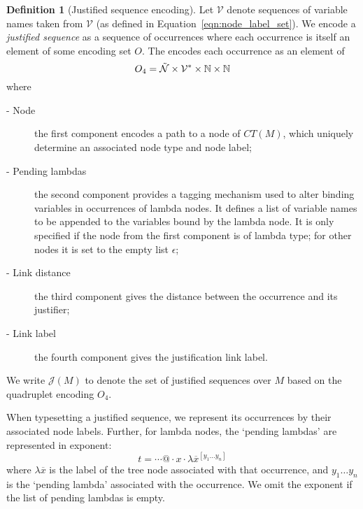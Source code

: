 \documentclass{article}
\theoremstyle{definition}
\newtheorem{definition}{Definition}[section]
\newcommand\Nodes{\mathcal{N}}%
\newcommand\ExtendedNodes{\tilde{\Nodes}}
\newcommand{\ctree}{CT} %
\def\justseqset{\mathcal{J}}
\begin{document}
\begin{definition}[Justified sequence encoding]
    Let $\mathcal{V}$ denote sequences of variable names taken from $\mathcal{V}$ (as defined in Equation~\ref{eqn:node_label_set}).
    We encode a \emph{justified sequence} as a sequence of occurrences where each occurrence is itself an element of some encoding set $O$.
    The  encodes each occurrence as an element of
$$O_4 =  \ExtendedNodes\times \mathcal{V}^* \times\nat\times\nat$$
where
\begin{description}
    \item [- Node] the first component encodes a path to a node of $\ctree(M)$, which uniquely determine an associated node type and node label;
    \item[- Pending lambdas] the second component provides a tagging mechanism used to alter binding variables in occurrences of lambda nodes. It defines a list of variable names to be appended to the  variables bound by the lambda node. It is only specified if the node from the first component is of lambda type; for other nodes it is set to the empty list $\epsilon$;
    \item[- Link distance] the third component gives the distance between the occurrence and its justifier;
    \item[- Link label] the fourth component gives the justification link label.
\end{description}
\end{definition}

We write $\justseqset(M)$ to denote the set of justified sequences over $M$ based on the quadruplet encoding $O_4$.

When typesetting a justified sequence, we represent its occurrences by their associated node labels. Further, for lambda nodes, the `pending lambdas' are represented in exponent:
$$t = \cdots @ \cdot x \cdot \lambda\overline{x}^{[y_1 \ldots y_n]}$$
where $\lambda\overline{x}$ is the label of the tree node associated with that occurrence, and $y_1 \ldots y_n$ is the `pending lambda' associated with the occurrence. We omit the exponent if the list of pending lambdas is empty.
\end{document}
